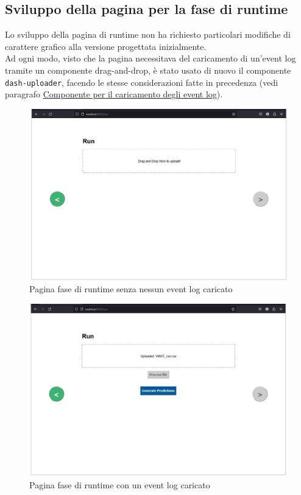 
\subsection{Sviluppo della pagina per la fase di runtime}
Lo sviluppo della pagina di runtime non ha richiesto particolari modifiche di carattere grafico alla versione progettata inizialmente.
\\ 
Ad ogni modo, visto che la pagina necessitava del caricamento di un'event log tramite un componente \gls{drag-and-drop}, è stato usato di nuovo il componente \texttt{dash-uploader}, facendo le stesse considerazioni fatte in precedenza (vedi paragrafo \hyperref[subsubsec:dash-uploader]{Componente per il caricamento degli event log}).


\begin{figure}[H] 
    \centering 
    \includegraphics[width=0.7\columnwidth]{immagini/pag-run-no-event-log.jpg} 
    \caption{Pagina fase di runtime senza nessun event log caricato}
\end{figure}

\begin{figure}[H] 
    \centering 
    \includegraphics[width=0.7\columnwidth]{immagini/pag-run-loaded-event-log.jpg} 
    \caption{Pagina fase di runtime con un event log caricato}
\end{figure}

